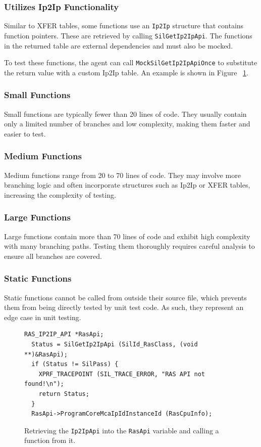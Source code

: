 \documentclass[conference]{IEEEtran}
\begin{document}
\subsubsection*{\textbf{Utilizes Ip2Ip Functionality}}
Similar to XFER tables, some functions use an \texttt{Ip2Ip} structure that contains function pointers. These are retrieved by calling \texttt{SilGetIp2IpApi}. The functions in the returned table are external dependencies and must also be mocked.  

To test these functions, the agent can call \texttt{MockSilGetIp2IpApiOnce} to substitute the return value with a custom Ip2Ip table. An example is shown in Figure ~\ref{fig:ip2ip_example}.

\subsubsection*{\textbf{Small Functions}}
Small functions are typically fewer than 20 lines of code. They usually contain only a limited number of branches and low complexity, making them faster and easier to test.

\subsubsection*{\textbf{Medium Functions}}
Medium functions range from 20 to 70 lines of code. They may involve more branching logic and often incorporate structures such as Ip2Ip or XFER tables, increasing the complexity of testing.

\subsubsection*{\textbf{Large Functions}}
Large functions contain more than 70 lines of code and exhibit high complexity with many branching paths. Testing them thoroughly requires careful analysis to ensure all branches are covered.

\subsubsection*{\textbf{Static Functions}}
Static functions cannot be called from outside their source file, which prevents them from being directly tested by unit test code. As such, they represent an edge case in unit testing.

\begin{figure}[hbt!]
  \centering
  \begin{lstlisting}[style=cstyle]
  RAS_IP2IP_API *RasApi; 
  Status = SilGetIp2IpApi (SilId_RasClass, (void **)&RasApi); 
  if (Status != SilPass) { 
    XPRF_TRACEPOINT (SIL_TRACE_ERROR, "RAS API not found!\n"); 
    return Status; 
  } 
  RasApi->ProgramCoreMcaIpIdInstanceId (RasCpuInfo); 
  \end{lstlisting}
  \caption{Retrieving the \texttt{Ip2IpApi} into the \texttt{RasApi} variable and calling a function from it.}
  \label{fig:ip2ip_example}
\end{figure}
\end{document}
